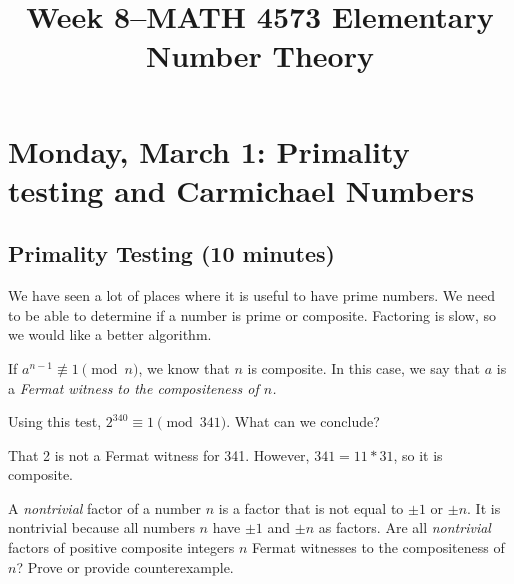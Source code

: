 \documentclass[letterpaper, 11 pt]{article}
\title{Week 8--MATH 4573 Elementary Number Theory}
\begin{document}
\maketitle
\tableofcontents
\section{Monday, March 1: Primality testing and Carmichael Numbers}
\subsection{Primality Testing (10 minutes)}

We have seen a lot of places where it is useful to have prime numbers. We need to be able to determine if a number is prime or composite. Factoring is slow, so we would like a better algorithm. 

\begin{defn}
 If $a^{n-1}\not\equiv 1 \pmod n$, we know that $n$ is composite. In this case, we say that $a$ is a \emph{Fermat witness to the compositeness of $n$.}
\end{defn}

\begin{cb}
Using this test, $2^{340} \equiv 1 \pmod{341}$. What can we conclude?
\end{cb}
\begin{solution}
That 2 is not a Fermat witness for 341. However, $341=11*31$, so it is composite. 
\end{solution}




\begin{br}[5 minutes]A \emph{nontrivial} factor of a number $n$ is a factor that is not equal to $\pm 1$ or $\pm n$. It is nontrivial because all numbers $n$ have $\pm 1$ and $\pm n$ as factors. 
Are all \emph{nontrivial} factors of positive composite integers $n$ Fermat witnesses to the compositeness of $n$? Prove or provide counterexample.
\end{br}
\begin{solution}
 \end{solution}
\end{document}
